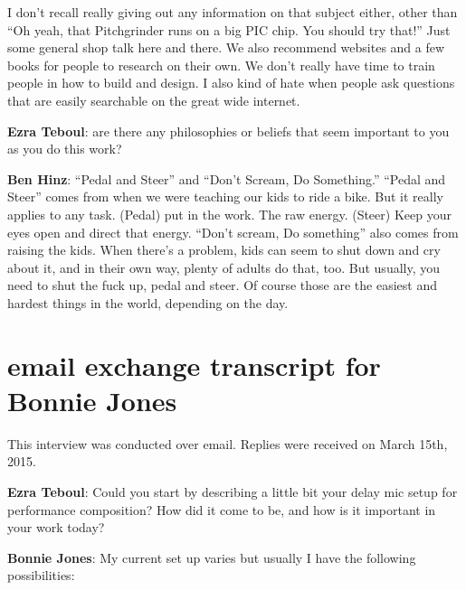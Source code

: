 I don't recall really giving out any information on that subject either, other 
than ``Oh yeah, that Pitchgrinder runs on a big PIC chip. You should try that!'' Just 
some general shop talk here and there. We also recommend websites and a few 
books for people to research on their own. We don’t really have time to train 
people in how to build and design. I also kind of hate when people ask questions 
that are easily searchable on the great wide internet.

\textbf{Ezra Teboul}: are there any philosophies or beliefs that seem important to you as
you do this work?  

\textbf{Ben Hinz}: ``Pedal and Steer'' and ``Don't Scream, Do Something.''
``Pedal and Steer'' comes from when we were teaching our kids to ride a
bike. But it really applies to any task. (Pedal) put in the work. The
raw energy. (Steer) Keep your eyes open and direct that energy.
``Don't scream, Do something'' also comes from raising the kids. When
there's a problem, kids can seem to shut down and cry about it, and in
their own way, plenty of adults do that, too. But usually, you need to
shut the fuck up, pedal and steer. Of course those are the easiest and
hardest things in the world, depending on the day.

\newpage

\clearpage 
\section{email exchange transcript for Bonnie Jones}

This interview was conducted over email. Replies were received on March 15th, 2015. 

\textbf{Ezra Teboul}: Could you start by describing a little bit your delay \/ mic setup for performance \/ composition? How did it come to be, and how is it important in your work today?

\textbf{Bonnie Jones}: My current set up varies but usually I have the following possibilities: 

